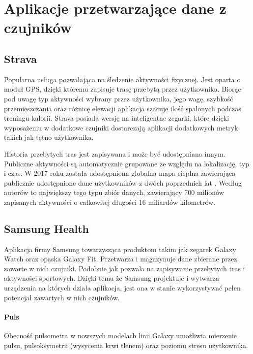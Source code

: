 \section{Aplikacje przetwarzające dane z czujników}

\subsection{Strava}
\label{sec:strava}
Popularna usługa pozwalająca na śledzenie aktywności fizycznej. Jest oparta o moduł GPS, dzięki któremu zapisuje trasę przebytą przez użytkownika. Biorąc pod uwagę typ aktywności wybrany przez użytkownika, jego wagę, szybkość przemieszczania oraz różnicę elewacji aplikacja szacuje ilość spalonych podczas treningu kalorii. Strava posiada wersję na inteligentne zegarki, które dzięki wyposażeniu w dodatkowe czujniki dostarczają aplikacji dodatkowych metryk takich jak tętno użytkownika. 

Historia przebytych tras jest zapisywana i może być udostępniana innym. Publiczne aktywności są automatycznie grupowane ze względu na lokalizację, typ i czas. W 2017 roku została udostępniona globalna mapa cieplna zawierająca publicznie udostępnione dane użytkowników z dwóch poprzednich lat \cite{Strava_Heatmap}. Według autorów to największy tego typu zbiór danych, zawierający 700 milionów zapisanych aktywności o całkowitej długości 16 miliardów kilometrów.


\subsection{Samsung Health}
Aplikacja firmy Samsung towarzysząca produktom takim jak zegarek Galaxy Watch oraz opaska Galaxy Fit. Przetwarza i magazynuje dane zbierane przez zawarte w nich czujniki. Podobnie jak  pozwala na zapisywanie przebytych tras i aktywności sportowych. Dzięki temu że Samsung projektuje i wytwarza urządzenia na których działa aplikacja, jest ona w stanie wykorzystywać pełen potencjał zawartych w nich czujników.

\paragraph{Puls} Obecność pulsometra w nowszych modelach linii Galaxy umożliwia mierzenie pulsu, pulsoksymetrii (wysycenia krwi tlenem) oraz poziomu stresu użytkownika. 

